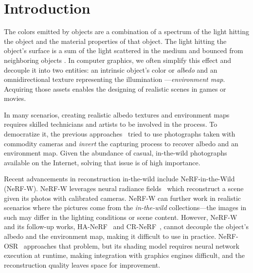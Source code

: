 \section{Introduction}
  \label{sec:lumigauss-introduction}

  The colors emitted by objects are a combination of a spectrum of the light
  hitting the object and the material properties of that object.
  The light hitting the object's surface is a sum of the light scattered in
  the medium and bounced from neighboring objects \cite{whitted1979improved}.
  In computer graphics, we often simplify this effect and decouple it into two
  entities: an intrinsic object's color or \textit{albedo} and an
  omnidirectional texture representing the illumination
  \cite{ramamoorthi2001envmap}---\textit{environment map}.
  Acquiring those assets enables the designing of realistic scenes in games or
  movies.

  In many scenarios, creating realistic albedo textures and environment maps
  requires skilled technicians and artists to be involved in the process.
  To democratize it, the previous approaches~\cite{rudnev2022nerfosr,
  gardner2023neusky, wang2023fegr} tried to use photographs taken with
  commodity cameras and \textit{invert} the capturing process to recover
  albedo and an environment map.
  Given the abundance of casual, in-the-wild photographs available on the
  Internet, solving that issue is of high importance.

  Recent advancements in reconstruction in-the-wild include
  NeRF-in-the-Wild~\cite{martin2021nerfw} (NeRF-W).
  NeRF-W leverages neural radiance fields~\cite{mildenhall2020nerf} which
  reconstruct a scene given its photos with calibrated cameras.
  NeRF-W can further work in realistic scenarios where the pictures come from
  the \textit{in-the-wild} collections---the images in such may differ in the
  lighting conditions or scene content.
  However, NeRF-W and its follow-up works, HA-NeRF~\cite{chen2022hallucinated}
  and CR-NeRF~\cite{yang2023crnerf}, cannot decouple the object's albedo and
  the environment map, making it difficult to use in practice.
  NeRF-OSR~\cite{rudnev2022nerfosr} approaches that problem, but its shading
  model requires neural network execution at runtime, making integration with
  graphics engines difficult, and the reconstruction quality leaves space for
  improvement.

